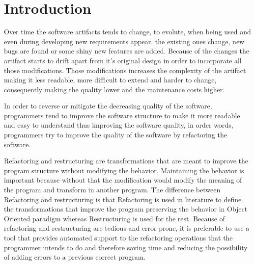 
% 
% 

\section{Introduction}

Over time the software artifacts tends to change, to evolute, %
 when being used and even during developing new requirements appear, the existing ones change, new bugs are found or some shiny new features are added.
Because of the changes the artifact starts to drift apart from it's original design in order to incorporate all those modifications.
Those modifications increases the complexity of the artifact making it less readable, more difficult to extend and harder to change, consequently making the quality lower and the maintenance costs higher. %

In order to reverse or mitigate the decreasing quality of the software, programmers tend to improve the software structure to make it more readable and easy to understand thus improving the software quality, in order words, programmers try to improve the quality of the software by refactoring the software.

Refactoring and restructuring are transformations that are meant to improve the program structure without modifying the behavior. Maintaining the behavior is important because without that the modification would modify the meaning of the program and transform in another program.
The difference between Refactoring and restructuring is that Refactoring is used in literature to define the transformations that improve the program preserving the behavior in Object Oriented paradigm \cite{opdyke1992refactoring} \cite{fowlerrefactoring1999} whereas Restructuring is used for the rest. \cite{griswold1993automated} \cite{softrest1986} %
Because of refactoring and restructuring are tedious and error prone, it is preferable to use a tool that provides automated support to the refactoring operations that the programmer intends to do and therefore saving time and reducing the possibility of adding errors to a previous correct program.


